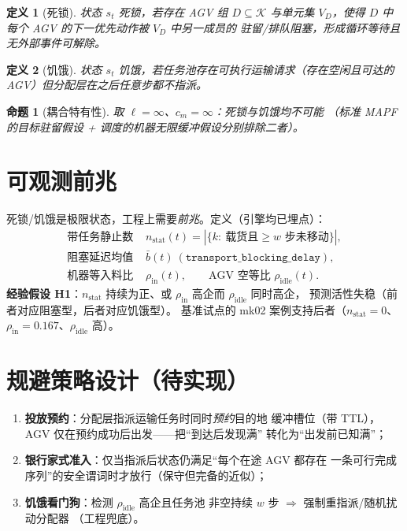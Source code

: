 \documentclass[UTF8,12pt,a4paper]{ctexart}
\newtheorem{definition}{定义}
\newtheorem{proposition}{命题}
\begin{document}
\begin{definition}[死锁]
状态 $s_t$ 死锁，若存在 AGV 组 $D\subseteq\mathcal{K}$ 与单元集
$V_D$，使得 $D$ 中每个 AGV 的下一优先动作被 $V_D$ 中另一成员的
驻留/排队阻塞，形成循环等待且无外部事件可解除。
\end{definition}

\begin{definition}[饥饿]
状态 $s_t$ 饥饿，若任务池存在可执行运输请求（存在空闲且可达的
AGV）但分配层在之后任意步都不指派。
\end{definition}

\begin{proposition}[耦合特有性]
取 $\ell{=}\infty$、$c_m{=}\infty$：死锁与饥饿均不可能
（标准 MAPF 的目标驻留假设 + 调度的机器无限缓冲假设分别排除二者）。
\end{proposition}

\section{可观测前兆}\label{sec:obs}

死锁/饥饿是极限状态，工程上需要\emph{前兆}。定义（引擎均已埋点）：
\begin{align}
\text{带任务静止数 } & n_{\mathrm{stat}}(t) = |\{k:\ \text{载货且}\ge w\text{ 步未移动}\}|,\\
\text{阻塞延迟均值 } & \bar{b}(t)\ (\texttt{transport\_blocking\_delay}),\\
\text{机器等入料比 } & \rho_{\mathrm{in}}(t),\qquad
\text{AGV 空等比 } \rho_{\mathrm{idle}}(t).
\end{align}
\textbf{经验假设 H1}：$n_{\mathrm{stat}}$ 持续为正、或
$\rho_{\mathrm{in}}$ 高企而 $\rho_{\mathrm{idle}}$ 同时高企，
预测活性失稳（前者对应阻塞型，后者对应饥饿型）。
基准试点的 mk02 案例支持后者（$n_{\mathrm{stat}}{=}0$、
$\rho_{\mathrm{in}}{=}0.167$、$\rho_{\mathrm{idle}}$ 高）。

\section{规避策略设计（待实现）}\label{sec:avoid}

\begin{enumerate}
  \item \textbf{投放预约}：分配层指派运输任务时同时\emph{预约}目的地
    缓冲槽位（带 TTL），AGV 仅在预约成功后出发——把``到达后发现满''
    转化为``出发前已知满''；
  \item \textbf{银行家式准入}：仅当指派后状态仍满足``每个在途 AGV 都存在
    一条可行完成序列''的安全谓词时才放行（保守但完备的近似）；
  \item \textbf{饥饿看门狗}：检测 $\rho_{\mathrm{idle}}$ 高企且任务池
    非空持续 $w$ 步 $\Rightarrow$ 强制重指派/随机扰动分配器
    （工程兜底）。
\end{enumerate}
\end{document}
